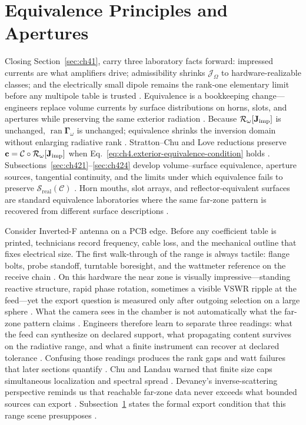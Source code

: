 \section{Equivalence Principles and Apertures}
\label{sec:ch42}
Closing Section~\ref{sec:ch41}, carry three laboratory facts forward: impressed currents are what amplifiers drive; admissibility shrinks $\mathcal{J}_\Omega$ to hardware-realizable classes; and the electrically small dipole remains the rank-one elementary limit before any multipole table is trusted \cite{stratton1941}. Equivalence is a bookkeeping change---engineers replace volume currents by surface distributions on horns, slots, and apertures while preserving the same exterior radiation \cite{stratton1941}. Because $\mathcal{R}_\omega[\mathbf{J}_{\mathrm{imp}}]$ is unchanged, $\operatorname{ran}\boldsymbol{\Gamma}_\omega$ is unchanged; equivalence shrinks the inversion domain without enlarging radiative rank \cite{devaney2004}. Stratton--Chu and Love reductions preserve $\mathbf{c}=\mathcal{C}\circ\mathcal{R}_\omega[\mathbf{J}_{\mathrm{imp}}]$ when Eq.~\eqref{eq:ch4.exterior-equivalence-condition} holds \cite{collin2001}.
Subsections~\ref{sec:ch421}--\ref{sec:ch424} develop volume--surface equivalence, aperture sources, tangential continuity, and the limits under which equivalence fails to preserve $\mathcal{S}_{\mathrm{real}}(\mathcal{C})$ \cite{stratton1941}. Horn mouths, slot arrays, and reflector-equivalent surfaces are standard equivalence laboratories where the same far-zone pattern is recovered from different surface descriptions \cite{collin2001}.
\begin{physicalvignette}
Consider Inverted-F antenna on a PCB edge. Before any coefficient table is printed, technicians record frequency, cable loss, and the mechanical outline that fixes electrical size. The first walk-through of the range is always tactile: flange bolts, probe standoff, turntable boresight, and the wattmeter reference on the receive chain \cite{hansen1988}.
On this hardware the near zone is visually impressive---standing reactive structure, rapid phase rotation, sometimes a visible VSWR ripple at the feed---yet the export question is measured only after outgoing selection on a large sphere \cite{harrington2001}. What the camera sees in the chamber is not automatically what the far-zone pattern claims \cite{stratton1941}.
Engineers therefore learn to separate three readings: what the feed can synthesize on declared support, what propagating content survives on the radiative range, and what a finite instrument can recover at declared tolerance \cite{devaney2004}. Confusing those readings produces the rank gaps and watt failures that later sections quantify \cite{pal2026}.
Chu and Landau warned that finite size caps simultaneous localization and spectral spread \cite{chu1948}. Devaney's inverse-scattering perspective reminds us that reachable far-zone data never exceeds what bounded sources can export \cite{devaney2004}.
Subsection~\ref{sec:ch42} states the formal export condition that this range scene presupposes \cite{stratton1941}.
\end{physicalvignette}
